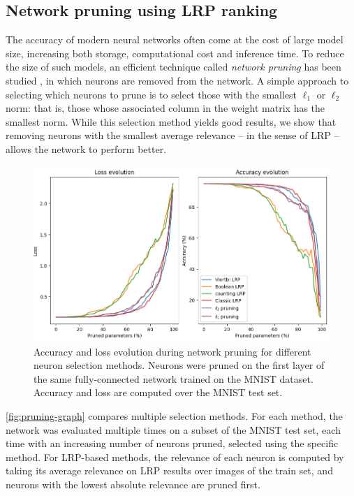 \documentclass[twocolumn]{../cs-classes/cs-classes}
\newcommand*{\1}{\digitsbb{1}}
\newcommand*{\0}{\digitsbb{0}}
\begin{document}
\subsection{Network pruning using LRP ranking}
The accuracy of modern neural networks often come at the cost of large model size, increasing both storage, computational cost and inference time. To reduce the size of such models, an efficient technique called \emph{network pruning} has been studied \cite{pruning-survey,new-pruning}, in which neurons are removed from the network. A simple approach to selecting which neurons to prune is to select those with the smallest $\ell_1$ or $\ell_2$ norm: that is, those whose associated column in the weight matrix has the smallest norm. While this selection method yields good results, we show that removing neurons with the smallest average relevance -- in the sense of LRP -- allows the network to perform better.
\begin{figure}[H]
    \centering
    \includegraphics[width=\linewidth]{pruning-graph-large.png}
    \caption{Accuracy and loss evolution during network pruning for different neuron selection methods. Neurons were pruned on the first layer of the same fully-connected network trained on the MNIST dataset. Accuracy and loss are computed over the MNIST test set.}
    \label{fig:pruning-graph}
\end{figure}

\autoref{fig:pruning-graph} compares multiple selection methods. For each method, the network was evaluated multiple times on a subset of the MNIST test set, each time with an increasing number of neurons pruned, selected using the specific method. For LRP-based methods, the relevance of each neuron is computed by taking its average relevance on LRP results over images of the train set, and neurons with the lowest absolute relevance are pruned first.
\end{document}
